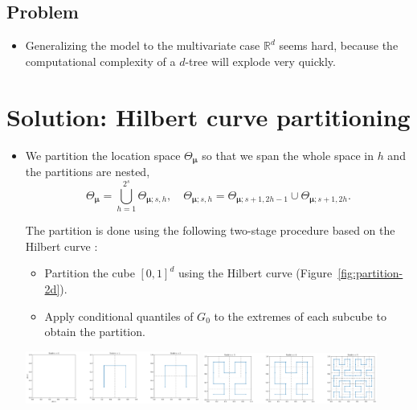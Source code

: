 \documentclass[a0,portrait]{a0poster}
\begin{document}
\begin{multicols}{2}
\subsection*{Problem}

\begin{itemize}
    \item[] Generalizing the model to the multivariate case $ \mathbb{R}^{d}$ seems hard, because the computational complexity of a $ d$-tree will explode very quickly.
\end{itemize}


\color{DarkRed}
\section*{Solution: Hilbert curve partitioning}
\color{Black}
\begin{itemize}
    \item[] We partition the location space $ \Theta_{\bm{\mu}}$ so that we span the whole space in $ h$ and the partitions are nested,
        \[
            \Theta_{\bm{\mu}} = \bigcup_{h=1}^{2^{s}} \Theta_{\bm{\mu}; s,h}, \quad  \Theta_{\bm{\mu}; s,h} = \Theta_{\bm{\mu}; s+1, 2h-1} \cup \Theta_{\bm{\mu};s+1, 2h}.
        \]

        \vspace{.5cm}

        The partition is done using the following two-stage procedure based on the Hilbert curve \citep{hilbert1891}:
        \begin{itemize}
            \item Partition the cube $ [0,1]^{d}$ using the Hilbert curve (Figure~\ref{fig:partition-2d}).

            \item Apply conditional quantiles of $ G_0$ to the extremes of each subcube to obtain the partition.
        \end{itemize}

        \begin{center}
            \includegraphics[trim={0 0 0 0}, clip, width=0.45\textwidth]{figures/partition_2d_top2.png}
            \includegraphics[trim={0 0 0 0}, clip, width=0.45\textwidth]{figures/partition_2d_bot2.png}
            \label{fig:partition-2d}
        \end{center}


\end{itemize}
\end{multicols}
\end{document}
